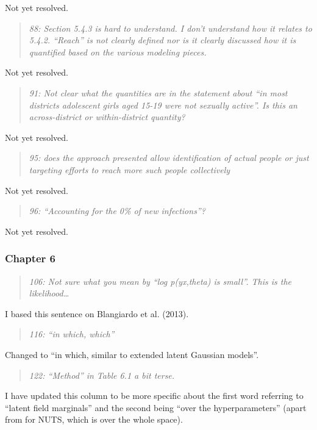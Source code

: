 \documentclass[
  12pt,
]{article}
\begin{document}
Not yet resolved.

\begin{quote}
\emph{88: Section 5.4.3 is hard to understand. I don't understand how it
relates to 5.4.2. ``Reach'' is not clearly defined nor is it clearly
discussed how it is quantified based on the various modeling pieces.}
\end{quote}

Not yet resolved.

\begin{quote}
\emph{91: Not clear what the quantities are in the statement about ``in
most districts adolescent girls aged 15-19 were not sexually active''.
Is this an across-district or within-district quantity?}
\end{quote}

Not yet resolved.

\begin{quote}
\emph{95: does the approach presented allow identification of actual
people or just targeting efforts to reach more such people collectively}
\end{quote}

Not yet resolved.

\begin{quote}
\emph{96: ``Accounting for the 0\% of new infections''?}
\end{quote}

Not yet resolved.

\subsubsection{Chapter 6}\label{chapter-6-1}

\begin{quote}
\emph{106: Not sure what you mean by ``log p(y\textbar x,theta) is
small''. This is the likelihood\ldots{}}
\end{quote}

I based this sentence on Blangiardo et al. (2013).

\begin{quote}
\emph{116: ``in which, which''}
\end{quote}

Changed to ``in which, similar to extended latent Gaussian models''.

\begin{quote}
\emph{122: ``Method'' in Table 6.1 a bit terse.}
\end{quote}

I have updated this column to be more specific about the first word
referring to ``latent field marginals'' and the second being ``over the
hyperparameters'' (apart from for NUTS, which is over the whole space).
\end{document}
